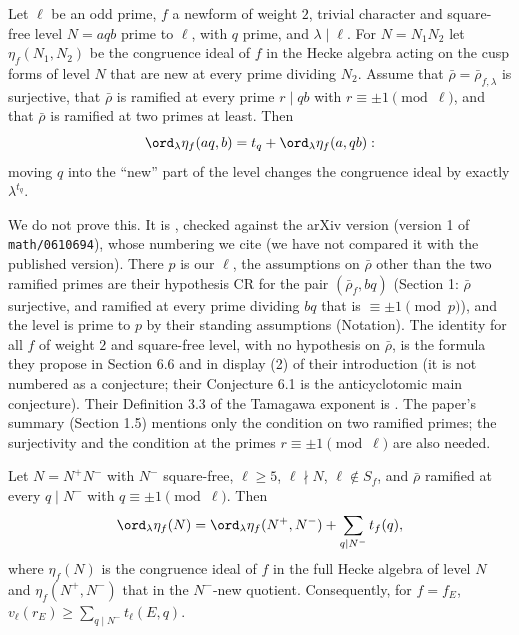 \begin{theorem}\label{thm:modgalrep:pollack-weston}
Let $\ell$ be an odd prime, $f$ a newform of weight $2$, trivial character and square-free level $N=aqb$ prime to $\ell$, with $q$ prime, and $\lambda\mid\ell$. For $N=N_1N_2$ let
$\eta_f(N_1,N_2)$ be the congruence ideal of $f$ in the Hecke algebra acting on the cusp forms of level $N$ that are new at every prime dividing $N_2$. Assume that $\bar\rho=\bar\rho_{f,\lambda}$
is surjective, that $\bar\rho$ is ramified at every prime $r\mid qb$ with $r\equiv\pm1\pmod\ell$, and that $\bar\rho$ is ramified at two primes at least. Then
\[
\ord_\lambda\eta_f(aq,b)=t_q+\ord_\lambda\eta_f(a,qb):
\]
moving $q$ into the ``new'' part of the level changes the congruence ideal by exactly $\lambda^{t_q}$.
\end{theorem}

We do not prove this. It is \cite[Theorem 6.11]{PollackWeston11}, checked against the arXiv version (version 1 of
\texttt{math/0610694}), whose numbering we cite (we have not compared it with the
published version). There $p$ is our $\ell$, the assumptions on $\bar\rho$ other than the two ramified primes are their hypothesis CR for the pair $(\bar\rho_f,bq)$ (Section 1:
$\bar\rho$ surjective, and ramified at every prime dividing $bq$ that is $\equiv\pm1\pmod p$), and the level is prime to $p$ by their standing assumptions (Notation). The identity
for all $f$ of weight $2$ and square-free level, with no hypothesis on $\bar\rho$, is the formula they propose in Section 6.6 and in display (2) of their introduction (it is not
numbered as a conjecture; their Conjecture 6.1 is the anticyclotomic main conjecture). Their Definition 3.3 of the Tamagawa exponent is .
The paper's summary (Section 1.5) mentions only the condition on two ramified primes; the surjectivity and the condition at the primes $r\equiv\pm1\pmod\ell$ are also needed.

\begin{theorem}\label{thm:modgalrep:kim-ota}
Let $N=N^+N^-$ with $N^-$ square-free, $\ell\ge5$, $\ell\nmid N$, $\ell\notin S_f$, and $\bar\rho$ ramified at every $q\mid N^-$ with $q\equiv\pm1\pmod\ell$. Then
\[
\ord_\lambda\eta_f(N)=\ord_\lambda\eta_f(N^+,N^-)+\sum_{q\mid N^-}t_f(q),
\]
where $\eta_f(N)$ is the congruence ideal of $f$ in the full Hecke algebra of level $N$ and $\eta_f(N^+,N^-)$ that in the $N^-$-new quotient. Consequently, for $f=f_E$,
$v_\ell(r_E)\ge\sum_{q\mid N^-}t_\ell(E,q)$.
\end{theorem}

